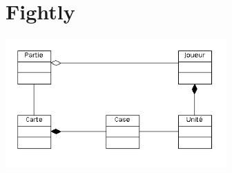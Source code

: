 \documentclass[a4paper,10pt]{report}
\begin{document}
	\section{Fightly}
	
		\includegraphics[width=320px]{diagrammes/concept-fightly.png}
\end{document}
